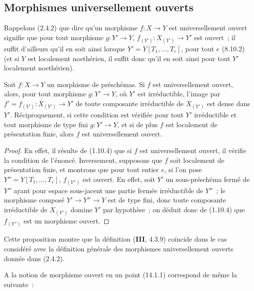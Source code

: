 \subsection{Morphismes universellement ouverts}
\label{subsection:IV.14.3-fr}

\begin{env}[14.3.1]
\label{IV.14.3.1-fr}
Rappelons (2.4.2) que dire qu'un morphisme $f:X\to Y$ est universellement ouvert
signifie que pour tout morphisme $g:Y'\to Y$, $f_{(Y')}:X_{(Y')}\to Y'$ est
ouvert~; il suffit d'ailleurs qu'il en soit ainsi lorsque
$Y'=Y[T_1,\ldots,T_e]$, pour tout $e$ (8.10.2) (et si $Y$ est localement
noethérien, il suffit donc qu'il en soit ainsi pour tout $Y'$ localement
noethérien).
\end{env}

\begin{proposition}[14.3.2]
\label{IV.14.3.2-fr}
Soit $f:X\to Y$ un morphisme de préschémas. Si $f$ est universellement ouvert,
alors, pour tout morphisme $g:Y'\to Y$, où $Y'$ est irréductible, l'image par
$f'=f_{(Y')}:X_{(Y')}\to Y'$ de toute composante irréductible de $X_{(Y')}$ est
dense dans $Y'$. Réciproquement, si cette condition est vérifiée pour tout $Y'$
irréductible et tout morphisme de type fini $g:Y'\to Y$, et si de plus $f$ est
localement de présentation finie, alors $f$ est universellement ouvert.
\end{proposition}

\begin{proof}
En effet, il résulte de (1.10.4) que si $f$ est universellement ouvert, il vérifie
la condition de l'énoncé. Inversement, supposons que $f$ soit localement de
présentation finie, et montrons que pour tout entier $e$, si l'on pose
$Y''=Y[T_1,\ldots,T_e]$, $f_{(Y'')}$ est ouvert. En effet, soit $Y'$ un
sous-préschéma fermé de $Y''$ ayant pour espace sous-jacent une partie fermée
irréductible de $Y''$~; le morphisme composé $Y'\to Y''\to Y$ est de type fini,
donc toute composante irréductible de $X_{(Y')}$ domine $Y'$ par hypothèse~; on
déduit donc de (1.10.4) que $f_{(Y'')}$ est un morphisme ouvert.
\end{proof}

Cette proposition montre que la définition (\textbf{III}, 4.3.9) coïncide dans
le cas considéré avec la définition générale des morphismes universellement
ouverts donnée dans (2.4.2).

A la notion de morphisme ouvert en un point (14.1.1) correspond de même la
suivante~:


